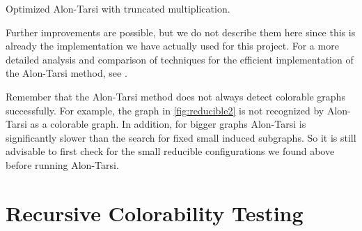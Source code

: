\begin{algorithm}
\caption{Optimized Alon-Tarsi with truncated multiplication.}
\SetAlgoLined
{}


\end{algorithm}

Further improvements are possible, but we do not describe them here since this is already the implementation we have actually used for this project. 
For a more detailed analysis and comparison of techniques for the efficient implementation 
of the Alon-Tarsi method, see \cite{dvorakefficientalontarsi}.


Remember that the Alon-Tarsi method does not always detect colorable graphs successfully. 
For example, the graph in \ref{fig:reducible2} is not recognized by Alon-Tarsi as a colorable graph. 
In addition, for bigger graphs Alon-Tarsi is significantly slower than the search for fixed small induced subgraphs.
So it is still advisable to first check for the small 
reducible configurations we found above before running Alon-Tarsi. 

\section{Recursive Colorability Testing}

